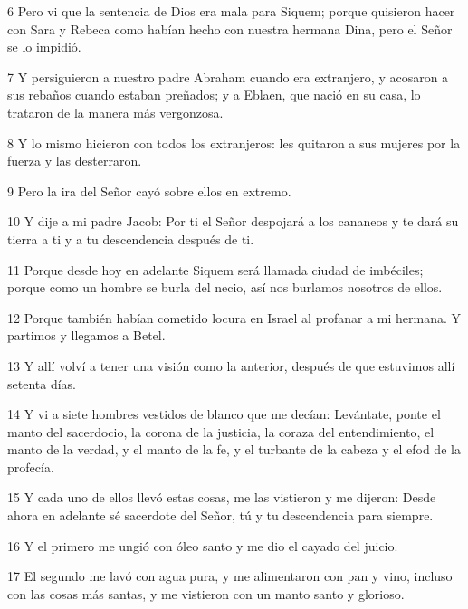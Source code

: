 \par 6 Pero vi que la sentencia de Dios era mala para Siquem; porque quisieron hacer con Sara y Rebeca como habían hecho con nuestra hermana Dina, pero el Señor se lo impidió.

\par 7 Y persiguieron a nuestro padre Abraham cuando era extranjero, y acosaron a sus rebaños cuando estaban preñados; y a Eblaen, que nació en su casa, lo trataron de la manera más vergonzosa.

\par 8 Y lo mismo hicieron con todos los extranjeros: les quitaron a sus mujeres por la fuerza y ​​las desterraron.

\par 9 Pero la ira del Señor cayó sobre ellos en extremo.

\par 10 Y dije a mi padre Jacob: Por ti el Señor despojará a los cananeos y te dará su tierra a ti y a tu descendencia después de ti.

\par 11 Porque desde hoy en adelante Siquem será llamada ciudad de imbéciles; porque como un hombre se burla del necio, así nos burlamos nosotros de ellos.

\par 12 Porque también habían cometido locura en Israel al profanar a mi hermana. Y partimos y llegamos a Betel.

\par 13 Y allí volví a tener una visión como la anterior, después de que estuvimos allí setenta días.

\par 14 Y vi a siete hombres vestidos de blanco que me decían: Levántate, ponte el manto del sacerdocio, la corona de la justicia, la coraza del entendimiento, el manto de la verdad, y el manto de la fe, y el turbante de la cabeza y el efod de la profecía.

\par 15 Y cada uno de ellos llevó estas cosas, me las vistieron y me dijeron: Desde ahora en adelante sé sacerdote del Señor, tú y tu descendencia para siempre.

\par 16 Y el primero me ungió con óleo santo y me dio el cayado del juicio.

\par 17 El segundo me lavó con agua pura, y me alimentaron con pan y vino, incluso con las cosas más santas, y me vistieron con un manto santo y glorioso.

